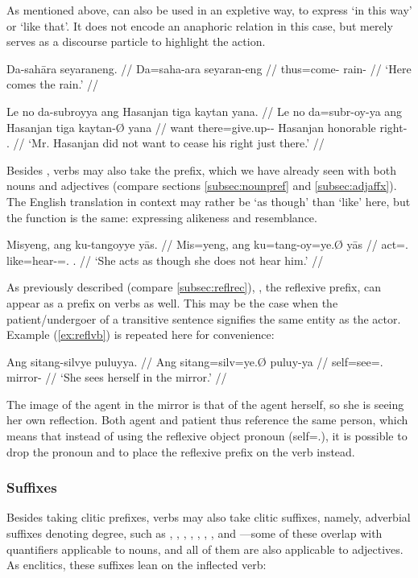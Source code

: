 As mentioned above,  can also be used in an expletive way, to 
express `in this way' or `like that'. It does not encode an anaphoric relation 
in this case, but merely serves as a discourse particle to highlight the action.

\pex
\a\begingl
	\gla Da-sahāra seyaraneng. //
	\glb Da=saha-ara seyaran-eng //
	\glc thus=come-\TsgI{} rain-\AargI{} //
	\glft `Here comes the rain.' //
\endgl

\a\begingl
	\gla Le no da-subroyya ang Hasanjan tiga kaytan yana. //
	\glb Le no da=subr-oy-ya ang Hasanjan tiga kaytan-Ø yana //
	\glc \PatT{} want there=give.up-\Neg{}-\TsgM{} \Aarg{} Hasanjan 
		honorable right-\Top{} \TsgM{}.\Gen{} //
	\glft `Mr. Hasanjan did not want to cease his right just there.' //
\endgl

\xe

Besides , verbs may also take the  prefix, 
which we have already seen with both nouns and adjectives (compare sections 
\ref{subsec:nounpref} and \ref{subsec:adjaffx}). The English translation in 
context may rather be `as though' than `like' here, but the function is the 
same: expressing alikeness and resemblance.

\ex\begingl
	\gla Misyeng, ang ku-tangoyye yās. //
	\glb Mis=yeng, ang ku=tang-oy=ye.Ø yās //
	\glc act=\TsgF{}.\Aarg{} \AgtT{} like=hear-\Neg{}=\TsgF{}.\Top{} 
		\TsgM{}.\Parg{} //
	\glft `She acts as though she does not hear him.' //
\endgl\xe

As previously described (compare \autoref{subsec:reflrec}), 
, the reflexive prefix, can appear as a prefix on 
verbs as well. This may be the case when the patient/undergoer of a 
transitive sentence signifies the same entity as the actor. Example 
(\ref{ex:reflvb}) is repeated here for convenience:

\ex\begingl
	\gla Ang sitang-silvye puluyya. //
	\glb Ang sitang=silv=ye.Ø puluy-ya //
	\glc \AgtT{} self=see=\TsgF{}.\Top{} mirror-\Loc{} //
	\glft `She sees herself in the mirror.' //
\endgl\xe

The image of the agent in the mirror is that of the agent herself, so she is 
seeing her own reflection. Both agent and patient thus reference the same 
person, which means that instead of using the reflexive object pronoun 
 (self=\TsgF{}.\Parg{}), it is possible to 
drop the pronoun and to place the reflexive prefix on the verb instead.

\subsubsection{Suffixes}
Besides taking clitic prefixes, verbs may also take clitic suffixes, namely, 
adverbial suffixes denoting degree, such as , 
, , 
, , 
, , and 
---some of these overlap with quantifiers applicable 
to nouns, and all of them are also applicable to adjectives. As enclitics, 
these suffixes lean on the inflected verb:

